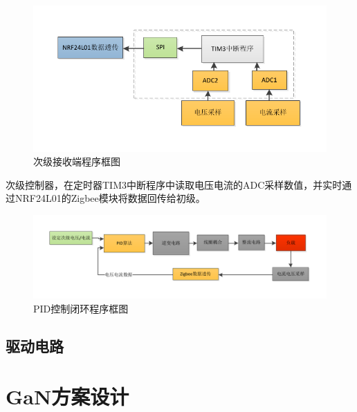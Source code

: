 ﻿\documentclass[UTF-8,12pt]{ctexart}
\begin{document}
            \begin{figure}[H]
              \centering
              \includegraphics[width=15cm]{sub.pdf}
              \caption{次级接收端程序框图}
              \label{frame_prim}
            \end{figure}
                次级控制器，在定时器TIM3中断程序中读取电压电流的ADC采样数值，并实时通过NRF24L01的Zigbee模块将数据回传给初级。
            \begin{figure}[H]
              \centering
              \includegraphics[width=15cm]{control.pdf}
              \caption{PID控制闭环程序框图}
              \label{control}
            \end{figure}


    \subsection{驱动电路}

\section{GaN方案设计}
\end{document}
